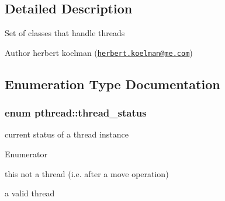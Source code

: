 \subsection{Detailed Description}
Set of classes that handle threads

\begin{DoxyAuthor}{Author}
herbert koelman (\href{mailto:herbert.koelman@me.com}{\tt herbert.\+koelman@me.\+com}) 
\end{DoxyAuthor}


\subsection{Enumeration Type Documentation}
\subsubsection[{\texorpdfstring{thread\+\_\+status}{thread\_status}}]{\setlength{\rightskip}{0pt plus 5cm}enum {\bf pthread\+::thread\+\_\+status}\hspace{0.3cm}{\ttfamily [strong]}}\hypertarget{group__threads_gac4b6e78f3d72c946ace7a92f3bec4101}{}\label{group__threads_gac4b6e78f3d72c946ace7a92f3bec4101}
current status of a thread instance \begin{Desc}
\item[Enumerator]\par
\begin{description}
\item[{\em 
not\+\_\+a\+\_\+thread\hypertarget{group__threads_ggac4b6e78f3d72c946ace7a92f3bec4101a8414cd8c988083af4eabb1311df873cf}{}\label{group__threads_ggac4b6e78f3d72c946ace7a92f3bec4101a8414cd8c988083af4eabb1311df873cf}
}]this not a thread (i.\+e. after a move operation) \item[{\em 
a\+\_\+thread\hypertarget{group__threads_ggac4b6e78f3d72c946ace7a92f3bec4101a13b3689524b86ca2caaee82399099df1}{}\label{group__threads_ggac4b6e78f3d72c946ace7a92f3bec4101a13b3689524b86ca2caaee82399099df1}
}]a valid thread \end{description}
\end{Desc}


